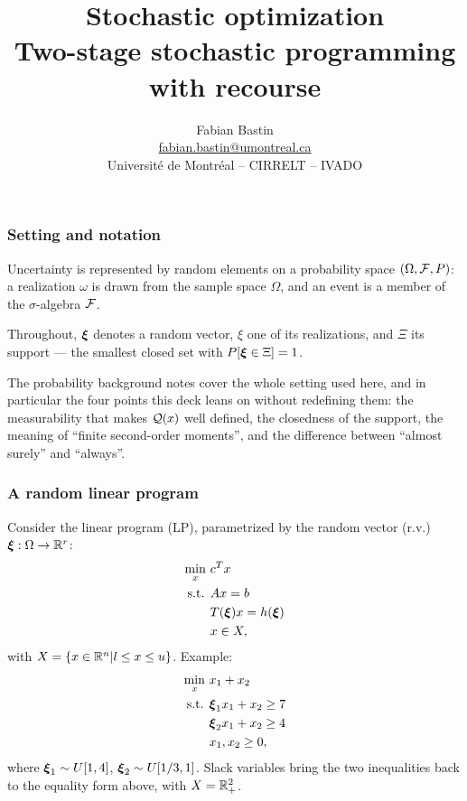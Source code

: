 \documentclass[aspectratio=169]{beamer}
\author[Fabian Bastin]{Fabian Bastin \\ \texorpdfstring{\url{fabian.bastin@umontreal.ca}}{fabian.bastin@umontreal.ca} \\ Université de Montréal -- CIRRELT -- IVADO}
\date{}
\title[Two-stage SP]{Stochastic optimization\\Two-stage stochastic programming with recourse}
\begin{document}
\frame{\titlepage}

\begin{frame}
	\frametitle{Setting and notation}
	
	Uncertainty is represented by {\red random elements} on a probability space $(\Omega, {\mathcal{F}}, P)$: a realization $\omega$ is drawn from the sample space $\Omega$, and an {\red event} is a member of the $\sigma$-algebra ${\mathcal{F}}$.
	
	\mbox{}
	
	Throughout, {\red ${\boldsymbol{\xi}}$} denotes a random vector, {\red $\xi$} one of its realizations, and {\red $\Xi$} its support --- the smallest closed set with $P[{\boldsymbol{\xi}} \in \Xi] = 1$.
	
	\mbox{}
	
	{\footnotesize The {\red probability background notes} cover the whole setting used here, and in particular the four points this deck leans on without redefining them: the measurability that makes ${\mathcal{Q}}(x)$ well defined, the closedness of the support, the meaning of ``finite second-order moments'', and the difference between ``almost surely'' and ``always''.}
	
\end{frame}

\begin{frame}
	\frametitle{A random linear program}
	\small
	
	Consider the linear program (LP), parametrized by the random vector (r.v.) ${\boldsymbol{\xi}}: \Omega \rightarrow {\mathbb{R}}^r$:
	\begin{align*}
		\min_x\ & c^T x \\
		\mbox{s.t. } & Ax = b \\
		& T({\boldsymbol{\xi}})x = h({\boldsymbol{\xi}}) \\
		& x \in X,
	\end{align*}
	with $X = \lbrace x \in {\mathbb{R}}^n | l \leq x \leq u \rbrace$. Example:
	\begin{align*}
		\min_x\ & x_1+x_2\\
		\mbox{s.t. } & {\boldsymbol{\xi}}_1x_1 + x_2 \geq 7 \\
		& {\boldsymbol{\xi}}_2x_1 + x_2 \geq 4 \\
		& x_1, x_2 \geq 0,
	\end{align*}
	where ${\boldsymbol{\xi}}_1 \sim U[1,4]$, ${\boldsymbol{\xi}}_2 \sim U[1/3,1]$.
	Slack variables bring the two inequalities back to the equality form above, with $X = {\mathbb{R}}^2_+$.
\end{frame}
\end{document}

